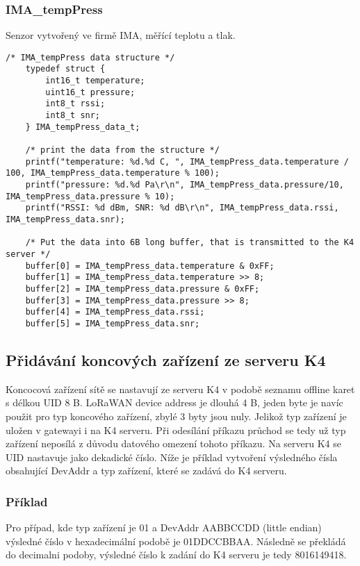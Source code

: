 \subsubsection{IMA\_tempPress}
Senzor vytvořený ve firmě IMA, měřící teplotu a tlak.

\begin{lstlisting}[style=CStyle]
    /* IMA_tempPress data structure */   
    typedef struct {
        int16_t temperature;
        uint16_t pressure;
        int8_t rssi;
        int8_t snr;
    } IMA_tempPress_data_t;
    
    /* print the data from the structure */
	printf("temperature: %d.%d C, ", IMA_tempPress_data.temperature / 100, IMA_tempPress_data.temperature % 100);
	printf("pressure: %d.%d Pa\r\n", IMA_tempPress_data.pressure/10, IMA_tempPress_data.pressure % 10);
	printf("RSSI: %d dBm, SNR: %d dB\r\n", IMA_tempPress_data.rssi, IMA_tempPress_data.snr);

    /* Put the data into 6B long buffer, that is transmitted to the K4 server */
	buffer[0] = IMA_tempPress_data.temperature & 0xFF;
	buffer[1] = IMA_tempPress_data.temperature >> 8;
	buffer[2] = IMA_tempPress_data.pressure & 0xFF;
	buffer[3] = IMA_tempPress_data.pressure >> 8;
	buffer[4] = IMA_tempPress_data.rssi;
	buffer[5] = IMA_tempPress_data.snr;
\end{lstlisting}


\subsection{Přidávání koncových zařízení ze serveru K4}
Koncocová zařízení sítě se nastavují ze serveru K4 v podobě seznamu offline karet s délkou UID 8 B.
LoRaWAN device address je dlouhá 4 B, jeden byte je navíc použit pro typ koncového zařízení, zbylé 3 byty jsou nuly.
Jelikož typ zařízení je uložen v gatewayi i na K4 serveru. Při odesílání příkazu průchod se tedy už typ zařízení neposílá z důvodu datového omezení tohoto příkazu.
Na serveru K4 se UID nastavuje jako dekadické číslo.
Níže je příklad vytvoření výsledného čísla obsahující DevAddr a typ zařízení, které se zadává do K4 serveru.

\subsubsection{Příklad}
Pro případ, kde typ zařízení je 01 a DevAddr AABBCCDD (little endian) výsledné číslo v hexadecimální podobě je 01DDCCBBAA. Následně se překládá do decimalni podoby, výsledné číslo k zadání do K4 serveru je tedy 8016149418.


